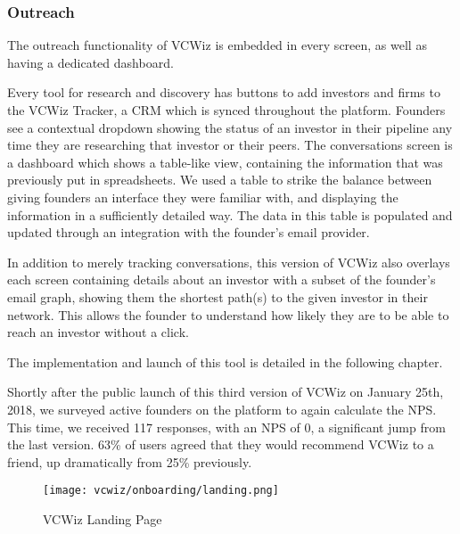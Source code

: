 \subsubsection{Outreach}

The outreach functionality of VCWiz is embedded in every screen, as well as having a dedicated dashboard.

Every tool for research and discovery has buttons to add investors and firms to the VCWiz Tracker, a CRM which is synced throughout the platform. Founders see a contextual dropdown showing the status of an investor in their pipeline any time they are researching that investor or their peers. The conversations screen is a dashboard which shows a table-like view, containing the information that was previously put in spreadsheets. We used a table to strike the balance between giving founders an interface they were familiar with, and displaying the information in a sufficiently detailed way. The data in this table is populated and updated through an integration with the founder's email provider.

In addition to merely tracking conversations, this version of VCWiz also overlays each screen containing details about an investor with a subset of the founder's email graph, showing them the shortest path(s) to the given investor in their network. This allows the founder to understand how likely they are to be able to reach an investor without a click.

The implementation and launch of this tool is detailed in the following chapter.

Shortly after the public launch of this third version of VCWiz on January 25th, 2018, we surveyed active founders on the platform to again calculate the NPS. This time, we received 117 responses, with an NPS of 0, a significant jump from the last version. 63\% of users agreed that they would recommend VCWiz to a friend, up dramatically from 25\% previously.

\begin{figure}[ht]
  \centering
  \texttt{[image: vcwiz/onboarding/landing.png]}
  \caption*{VCWiz Landing Page}
\end{figure}
